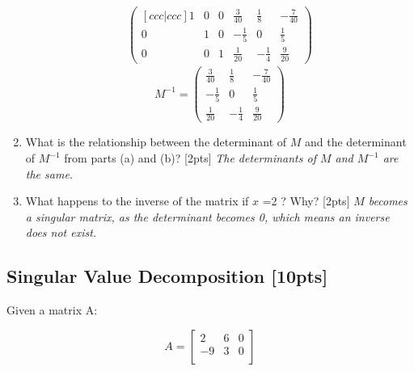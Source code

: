 \documentclass{article}
\begin{document}
\begin{enumerate}[label=(\alph*)]
\begin{align*}
\begin{pmatrix}[ccc|ccc]
            1 & 0 & 0 & \frac{3}{40} & \frac{1}{8} & -\frac{7}{40}\\
            0 & 1 & 0 & -\frac{1}{5} & 0 & \frac{1}{5} \\
            0 & 0 & 1 & \frac{1}{20} & -\frac{1}{4} & \frac{9}{20}
        \end{pmatrix} 
    \end{align*}
    \begin{equation}
        M^{-1}=\begin{pmatrix}
            \frac{3}{40} & \frac{1}{8} & -\frac{7}{40}\\
            -\frac{1}{5} & 0 & \frac{1}{5} \\
            \frac{1}{20} & -\frac{1}{4} & \frac{9}{20}
        \end{pmatrix}
    \end{equation}
    \item What is the relationship between the determinant of $M$ and the determinant of $M^{-1}$ from parts (a) and (b)? [2pts] \newline
            \emph{The determinants of $M$ and $M^{-1}$ are the same.}
    \item What happens to the inverse of the matrix if $x$ =2 ? Why? [2pts] \newline
            \emph{$M$ becomes a singular matrix, as the determinant becomes 0, which means an inverse does not exist.}
\end{enumerate}


\subsection{Singular Value Decomposition [10pts]}
Given a matrix A:

$$A = \begin{bmatrix}
  2 & 6 & 0 \\ 
  -9 & 3 & 0 \\
  \end{bmatrix}
$$
\end{document}
